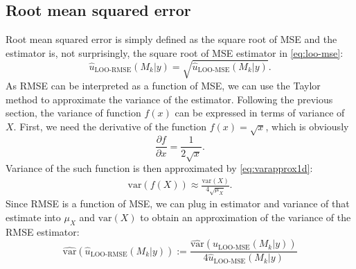 \documentclass{article}
\begin{document}

\subsection{Root mean squared error}
Root mean squared error is simply defined as the square root of MSE and the estimator is, not surprisingly, the square root of MSE estimator in \eqref{eq:loo-mse}:
\begin{equation*}
    \hat{u}_{\text{LOO-RMSE}}(M_k|y) = \sqrt{\hat{u}_{\text{LOO-MSE}}(M_k|y)}.
\end{equation*}
As RMSE can be interpreted as a function of MSE, we can use the Taylor method to approximate the variance of the estimator. Following the previous section, the variance of function $f(x)$ can be expressed in terms of variance of $X$. First, we need the derivative of the function $f(x)= \sqrt{x}$, which is obviously
$$
\frac{\partial f}{\partial x} = \frac{1}{2 \sqrt{x}}.
$$
Variance of the such function is then approximated by \eqref{eq:varapprox1d}:
\begin{align*}
    \text{var}(f(X)) \approx \frac{\text{var}(X)}{4 \sqrt{\mu_X}}.
\end{align*}
Since RMSE is a function of MSE, we can plug in estimator and variance of that estimate into $\mu_X$ and $\text{var}(X)$ to obtain an approximation of the variance of the RMSE estimator:
\begin{equation}
    \widehat{\text{var}} \left( \hat{u}_{\text{LOO-RMSE}}(M_k|y) \right) :=  \frac{\widehat{\text{var}}\left( \hat{u}_{\text{LOO-MSE}}(M_k | y) \right)}{4 \hat{u}_{\text{LOO-MSE}}(M_k | y)} \label{eq:var-loo-rmse}
\end{equation}
\end{document}
